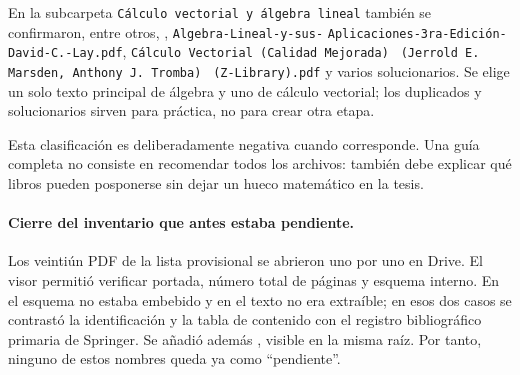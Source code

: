 En la subcarpeta \texttt{Cálculo vectorial y álgebra lineal} también se
confirmaron, entre otros,
,
\texttt{Algebra-Lineal-y-sus-}\allowbreak
\texttt{Aplicaciones-3ra-Edición-}\allowbreak
\texttt{David-C.-Lay.pdf},
\texttt{Cálculo Vectorial (Calidad Mejorada) }\allowbreak
\texttt{(Jerrold E. Marsden, Anthony J. Tromba) }\allowbreak
\texttt{(Z-Library).pdf}
y varios solucionarios. Se elige un solo texto principal de álgebra y uno de
cálculo vectorial; los duplicados y solucionarios sirven para práctica, no
para crear otra etapa.

Esta clasificación es deliberadamente negativa cuando corresponde. Una guía
completa no consiste en recomendar todos los archivos: también debe explicar
qué libros pueden posponerse sin dejar un hueco matemático en la tesis.

\paragraph{Cierre del inventario que antes estaba pendiente.}
Los veintiún PDF de la lista provisional se abrieron uno por uno en Drive. El
visor permitió verificar portada, número total de páginas y esquema interno.
En  el esquema no estaba embebido y en
 el texto no era extraíble; en esos dos casos se
contrastó la identificación y la tabla de contenido con el registro bibliográfico
primaria de Springer. Se añadió además , visible en
la misma raíz. Por tanto, ninguno de estos nombres queda ya como ``pendiente''.

